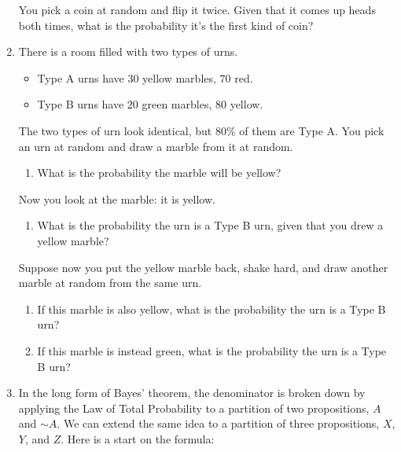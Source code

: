 \documentclass[justified]{tufte-book}
\providecommand{\tightlist}{%
  \setlength{\itemsep}{0pt}\setlength{\parskip}{0pt}}
\renewcommand{\neg}{\mathbin{\sim}}
\theoremstyle{definition}
\theoremstyle{definition}
\theoremstyle{definition}
\theoremstyle{remark}
\begin{document}
\begin{enumerate}
  You pick a coin at random and flip it twice. Given that it comes up
  heads both times, what is the probability it's the first kind of coin?
\item
  There is a room filled with two types of urns.

  \begin{itemize}
  \tightlist
  \item
    Type A urns have \(30\) yellow marbles, \(70\) red.
  \item
    Type B urns have \(20\) green marbles, \(80\) yellow.
  \end{itemize}

  The two types of urn look identical, but \(80\%\) of them are Type A.
  You pick an urn at random and draw a marble from it at random.

  \begin{enumerate}
  \def\labelenumii{\alph{enumii}.}
  \tightlist
  \item
    What is the probability the marble will be yellow?
  \end{enumerate}

  Now you look at the marble: it is yellow.

  \begin{enumerate}
  \def\labelenumii{\alph{enumii}.}
  \setcounter{enumii}{1}
  \tightlist
  \item
    What is the probability the urn is a Type B urn, given that you drew
    a yellow marble?
  \end{enumerate}

  Suppose now you put the yellow marble back, shake hard, and draw
  another marble at random from the same urn.

  \begin{enumerate}
  \def\labelenumii{\alph{enumii}.}
  \setcounter{enumii}{2}
  \tightlist
  \item
    If this marble is also yellow, what is the probability the urn is a
    Type B urn?
  \item
    If this marble is instead green, what is the probability the urn is
    a Type B urn?
  \end{enumerate}
\item
  In the long form of Bayes' theorem, the denominator is broken down by
  applying the Law of Total Probability to a partition of two
  propositions, \(A\) and \(\neg A\). We can extend the same idea to a
  partition of three propositions, \(X\), \(Y\), and \(Z\). Here is a
  start on the formula:


\end{enumerate}
\end{document}
